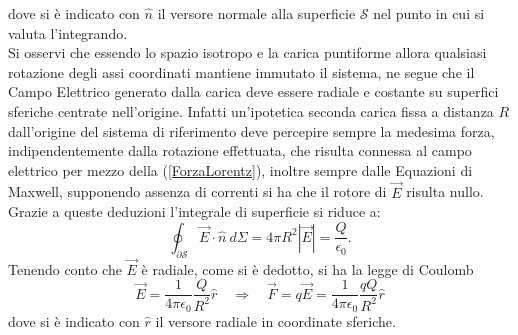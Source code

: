 dove si è indicato con $\hat{n}$ il versore normale alla superficie $\mathcal{S}$ nel punto in cui si valuta l'integrando.\\
Si osservi che essendo lo spazio 
isotropo e la carica puntiforme allora qualsiasi rotazione degli assi coordinati mantiene immutato il sistema, ne segue che 
il Campo Elettrico generato dalla carica deve essere radiale e costante su superfici sferiche centrate nell'origine. Infatti un'ipotetica seconda carica 
fissa a distanza $R$ dall'origine del sistema di riferimento deve percepire sempre la medesima forza, indipendentemente dalla rotazione effettuata, 
che risulta connessa al campo elettrico per mezzo della (\ref{ForzaLorentz}), inoltre sempre dalle Equazioni di Maxwell, supponendo assenza di correnti 
si ha che il rotore di $\vec{E}$ risulta nullo. Grazie a queste deduzioni l'integrale di superficie si riduce a:
\begin{equation*}
	\oint_{\partial\mathcal{S}}\vec{E}\cdot\hat{n}\ d\Sigma=4\pi R^2|\vec{E}|=\frac{Q}{\epsilon_0}.
\end{equation*}	
Tenendo conto che $\vec{E}$ è radiale, come si è dedotto, si ha la legge di Coulomb
\begin{equation}
	\vec{E}=\frac{1}{4\pi\epsilon_0}\frac{Q}{R^2}\hat{r} \quad \Rightarrow \quad \vec{F}=q\vec{E}=\frac{1}{4\pi\epsilon_0}\frac{qQ}{R^2}\hat{r}
\end{equation} 
dove si è indicato con $\hat{r}$ il versore radiale in coordinate sferiche.\\

